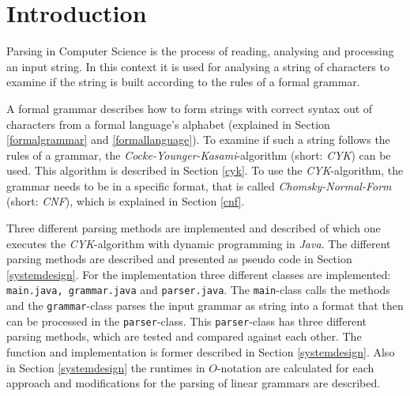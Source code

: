 \documentclass[a4paper, 11pt]{article}
\begin{document}

\begin{spacing}{1}


\newpage
\fancyhead[LO]{\empty}
{
  \hypersetup{linkcolor=black}
  \tableofcontents
}

\end{spacing}

\newpage















\section{Introduction}

Parsing in Computer Science is the process  of reading, analysing and processing an input string. In this context it is used for analysing a string of characters to examine if the string is built according to the rules of a formal grammar. 

A formal grammar describes how to form strings with correct syntax out of characters from a formal language's alphabet (explained in Section \ref{formalgrammar} and \ref{formallanguage}).
To examine if such a string follows the rules of a grammar, the \textit{Cocke-Younger-Kasami}-algorithm (short: \textit{CYK}) can be used. This algorithm is described in Section \ref{cyk}. To use the \textit{CYK}-algorithm, the grammar needs to be in a specific format, that is called \textit{Chomsky-Normal-Form} (short: \textit{CNF}), which is explained in Section \ref{cnf}. \cite{CYK_name, CYK1}


Three different parsing methods are implemented and described of which one executes the \textit{CYK}-algorithm with dynamic programming in \textit{Java}. The different parsing methods are described and presented as pseudo code in Section \ref{systemdesign}.
For the implementation three different classes are implemented: \texttt{main.java, grammar.java} and \texttt{parser.java}. The \texttt{main}-class calls the methods and the \texttt{grammar}-class parses the input grammar as string into a format that then can be processed in the \texttt{parser}-class. This \texttt{parser}-class has three different parsing methods, which are tested and compared against each other.
The function and implementation is former described in Section \ref{systemdesign}. Also in Section \ref{systemdesign} the runtimes in $O$-notation are calculated for each approach and modifications for the parsing of linear grammars are described.
\end{document}
